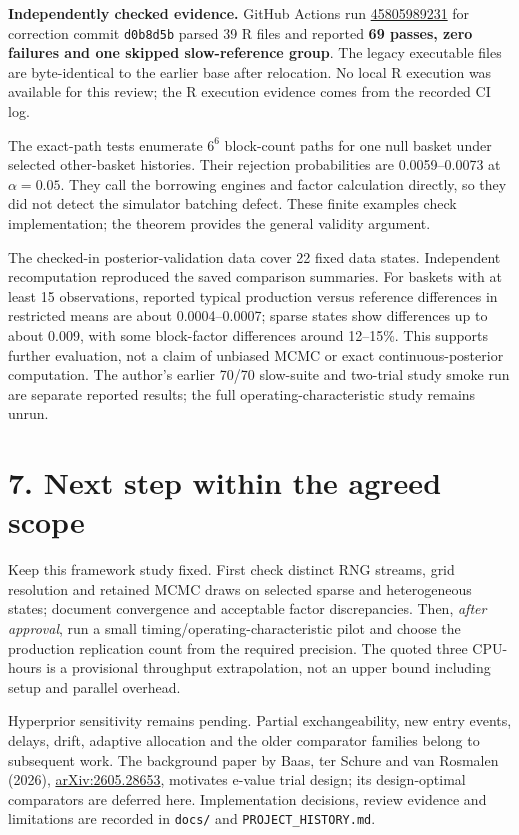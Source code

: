 \documentclass[10pt,a4paper]{article}
\begin{document}
\textbf{Independently checked evidence.}
GitHub Actions run \href{https://github.com/HenkvdPol/E-BBB-3/actions/runs/45805989231}{45805989231}
for correction commit \texttt{d0b8d5b} parsed 39 R files and reported
\textbf{69 passes, zero failures and one skipped slow-reference group}.
The legacy executable files are byte-identical to the earlier base after
relocation. No local R execution was available for this review; the R
execution evidence comes from the recorded CI log.

The exact-path tests enumerate $6^6$ block-count paths for one null basket
under selected other-basket histories. Their rejection probabilities are
0.0059--0.0073 at $\alpha=0.05$. They call the borrowing engines and factor
calculation directly, so they did not detect the simulator batching defect.
These finite examples check implementation; the theorem provides the general
validity argument.

The checked-in posterior-validation data cover 22 fixed data states.
Independent recomputation reproduced the saved comparison summaries.
For baskets with at least 15 observations, reported typical production versus
reference differences in restricted means are about 0.0004--0.0007; sparse
states show differences up to about 0.009, with some block-factor differences
around 12--15\%. This supports further evaluation, not a claim of unbiased
MCMC or exact continuous-posterior computation. The author's earlier
70/70 slow-suite and two-trial study smoke run are separate reported results;
the full operating-characteristic study remains unrun.

\section*{7. Next step within the agreed scope}
Keep this framework study fixed. First check distinct RNG streams, grid
resolution and retained MCMC draws on selected sparse and heterogeneous
states; document convergence and acceptable factor discrepancies. Then,
\emph{after approval}, run a small timing/operating-characteristic pilot and
choose the production replication count from the required precision.
The quoted three CPU-hours is a provisional throughput extrapolation,
not an upper bound including setup and parallel overhead.

Hyperprior sensitivity remains pending. Partial exchangeability, new entry
events, delays, drift, adaptive allocation and the older comparator families
belong to subsequent work. The background paper by Baas, ter Schure and
van Rosmalen (2026), \href{https://arxiv.org/abs/2605.28653}{arXiv:2605.28653},
motivates e-value trial design; its design-optimal comparators are deferred
here. Implementation decisions, review evidence and limitations are recorded
in \texttt{docs/} and \texttt{PROJECT\_HISTORY.md}.
\end{document}
